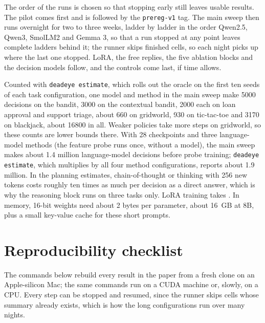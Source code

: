 The order of the runs is chosen so that stopping early still leaves usable results. The pilot comes first and is followed by the \texttt{prereg-v1} tag. The main sweep then runs overnight for two to three weeks, ladder by ladder in the order Qwen2.5, Qwen3, SmolLM2 and Gemma 3, so that a run stopped at any point leaves complete ladders behind it; the runner skips finished cells, so each night picks up where the last one stopped. LoRA, the free replies, the five ablation blocks and the decision models follow, and the controls come last, if time allows.

Counted with \texttt{deadeye estimate}, which rolls out the oracle on the first ten seeds of each task configuration, one model and method in the main sweep make 5000 decisions on the bandit, 3000 on the contextual bandit, 2000 each on loan approval and support triage, about 660 on gridworld, 930 on tic-tac-toe and 3170 on blackjack, about 16800 in all. Weaker policies take more steps on gridworld, so these counts are lower bounds there. With 28 checkpoints and three language-model methods (the feature probe runs once, without a model), the main sweep makes about 1.4 million language-model decisions before probe training; \texttt{deadeye estimate}, which multiplies by all four method configurations, reports about 1.9 million. In the planning estimates, chain-of-thought or thinking with 256 new tokens costs roughly ten times as much per decision as a direct answer, which is why the reasoning block runs on three tasks only. LoRA training takes . In memory, 16-bit weights need about 2 bytes per parameter, about 16~GB at 8B, plus a small key-value cache for these short prompts.

\section{Reproducibility checklist}
\label{app:repro}

The commands below rebuild every result in the paper from a fresh clone on an Apple-silicon Mac; the same commands run on a CUDA machine or, slowly, on a CPU. Every step can be stopped and resumed, since the runner skips cells whose summary already exists, which is how the long configurations run over many nights.

